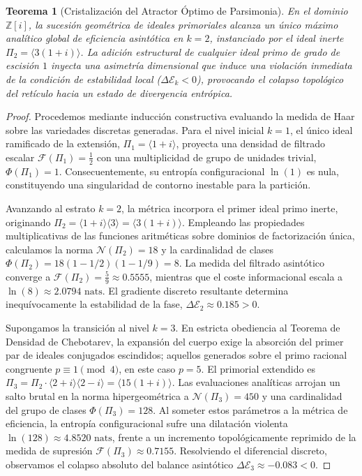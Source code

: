 \documentclass{article}
\numberwithin{equation}{section}
\theoremstyle{plain}
\newtheorem{teorema}{Teorema}[section]
\theoremstyle{definition}
\begin{document}
\begin{teorema}[Cristalización del Atractor Óptimo de Parsimonia]
\label{teo:chandrasekhar_lattice_formal}
En el dominio $\mathbb{Z}[i]$, la sucesión geométrica de ideales primoriales alcanza un único máximo analítico global de eficiencia asintótica en $k=2$, instanciado por el ideal inerte $\Pi_2 = \langle 3(1+i) \rangle$. La adición estructural de cualquier ideal primo de grado de escisión $1$ inyecta una asimetría dimensional que induce una violación inmediata de la condición de estabilidad local ($\Delta \mathcal{E}_k < 0$), provocando el colapso topológico del retículo hacia un estado de divergencia entrópica.
\end{teorema}

\begin{proof}
Procedemos mediante inducción constructiva evaluando la medida de Haar sobre las variedades discretas generadas. 
Para el nivel inicial $k=1$, el único ideal ramificado de la extensión, $\Pi_1 = \langle 1+i \rangle$, proyecta una densidad de filtrado escalar $\mathcal{F}(\Pi_1) = \frac{1}{2}$ con una multiplicidad de grupo de unidades trivial, $\Phi(\Pi_1) = 1$. Consecuentemente, su entropía configuracional $\ln(1)$ es nula, constituyendo una singularidad de contorno inestable para la partición.

Avanzando al estrato $k=2$, la métrica incorpora el primer ideal primo inerte, originando $\Pi_2 = \langle 1+i \rangle \langle 3 \rangle = \langle 3(1+i) \rangle$. Empleando las propiedades multiplicativas de las funciones aritméticas sobre dominios de factorización única, calculamos la norma $\mathcal{N}(\Pi_2) = 18$ y la cardinalidad de clases $\Phi(\Pi_2) = 18(1 - 1/2)(1 - 1/9) = 8$. 
La medida del filtrado asintótico converge a $\mathcal{F}(\Pi_2) = \frac{5}{9} \approx 0.5555$, mientras que el coste informacional escala a $\ln(8) \approx 2.0794 \text{ nats}$. El gradiente discreto resultante determina inequívocamente la estabilidad de la fase, $\Delta \mathcal{E}_2 \approx 0.185 > 0$.

Supongamos la transición al nivel $k=3$. En estricta obediencia al Teorema de Densidad de Chebotarev, la expansión del cuerpo exige la absorción del primer par de ideales conjugados escindidos; aquellos generados sobre el primo racional congruente $p \equiv 1 \pmod 4$, en este caso $p=5$. El primorial extendido es $\Pi_3 = \Pi_2 \cdot \langle 2+i \rangle \langle 2-i \rangle = \langle 15(1+i) \rangle$. Las evaluaciones analíticas arrojan un salto brutal en la norma hipergeométrica a $\mathcal{N}(\Pi_3) = 450$ y una cardinalidad del grupo de clases $\Phi(\Pi_3) = 128$.
Al someter estos parámetros a la métrica de eficiencia, la entropía configuracional sufre una dilatación violenta $\ln(128) \approx 4.8520 \text{ nats}$, frente a un incremento topológicamente reprimido de la medida de supresión $\mathcal{F}(\Pi_3) \approx 0.7155$.
Resolviendo el diferencial discreto, observamos el colapso absoluto del balance asintótico $\Delta \mathcal{E}_3 \approx -0.083 < 0$. 


\end{proof}
\end{document}
